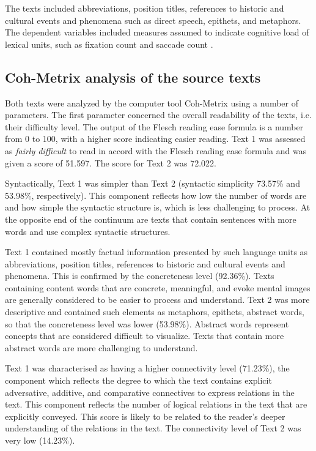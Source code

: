 \documentclass[output=paper]{langscibook}
\begin{document}
The texts included abbreviations, position titles, references to historic and cultural events and phenomena such as direct speech, epithets, and metaphors. The dependent variables included measures assumed to indicate cognitive load of lexical units, such as fixation count and saccade count \citep{Kokanova2018}.

\subsection{Coh-Metrix analysis of the source texts}
Both texts were analyzed by the computer tool Coh-Metrix \citep{Graesser2004} using a number of parameters. The first parameter concerned the overall readability of the texts, i.e. their difficulty level. The output of the Flesch reading ease formula is a number from 0 to 100, with a higher score indicating easier reading. Text 1 was assessed as \textit{fairly difficult} to read in accord with the Flesch reading ease formula and was given a score of 51.597. The score for Text 2 was 72.022.

Syntactically, Text 1 was simpler than Text 2 (syntactic simplicity 73.57\% and 53.98\%, respectively). This component reflects how low the number of words are and how simple the syntactic structure is, which is less challenging to process. At the opposite end of the continuum are texts that contain sentences with more words and use complex syntactic structures.

Text 1 contained mostly factual information presented by such language units as abbreviations, position titles, references to historic and cultural events and phenomena. This is confirmed by the concreteness level (92.36\%). Texts containing content words that are concrete, meaningful, and evoke mental images are generally considered to be easier to process and understand. Text 2 was more descriptive and contained such elements as metaphors, epithets, abstract words, so that the concreteness level was lower (53.98\%). Abstract words represent concepts that are considered difficult to visualize. Texts that contain more abstract words are more challenging to understand.

Text 1 was characterised as having a higher connectivity level (71.23\%), the component which reflects the degree to which the text contains explicit adversative, additive, and comparative connectives to express relations in the text. This component reflects the number of logical relations in the text that are explicitly conveyed. This score is likely to be related to the reader’s deeper understanding of the relations in the text. The connectivity level of Text 2 was very low (14.23\%).
\end{document}
